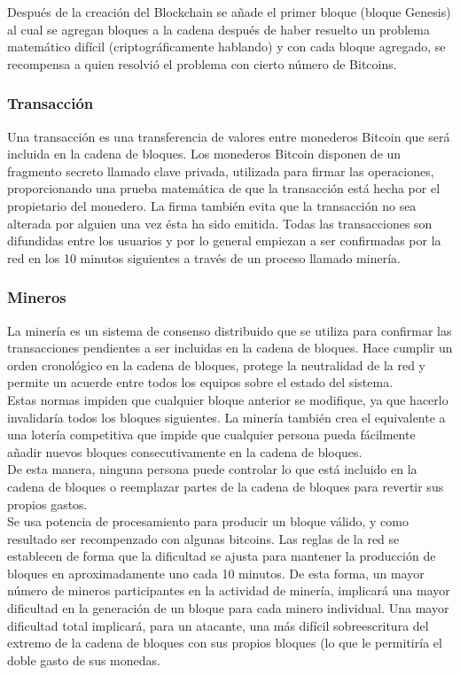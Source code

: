 \documentclass[12pt,letterpaper]{article}
\begin{document}
    Despu\'es de la creaci\'on del Blockchain se a\~nade el primer bloque (bloque Genesis) al cual se agregan bloques a la cadena despu\'es de haber resuelto un problema matem\'atico dif\'icil (criptogr\'aficamente hablando) y con cada bloque agregado, se recompensa a quien resolvi\'o el problema con cierto n\'umero de Bitcoins.

    \subsubsection*{Transacci\'on}

Una transacci\'on es una transferencia de valores entre monederos Bitcoin que ser\'a incluida en la cadena de bloques. Los monederos Bitcoin disponen de un fragmento secreto llamado clave privada, utilizada para firmar las operaciones, proporcionando una prueba matem\'atica de que la transacci\'on est\'a hecha por el propietario del monedero. La firma tambi\'en evita que la transacci\'on no sea alterada por alguien una vez \'esta ha sido emitida. Todas las transacciones son difundidas entre los usuarios y por lo general empiezan a ser confirmadas por la red en los 10 minutos siguientes a trav\'es de un proceso llamado miner\'ia.

		\subsubsection*{Mineros}
		La miner\'ia es un sistema de consenso distribuido que se utiliza para confirmar las transacciones pendientes a ser incluidas en la cadena de bloques. Hace cumplir un orden cronol\'ogico en la cadena de bloques, protege la neutralidad de la red y permite un acuerde entre todos los equipos sobre el estado del sistema. 
        \\
		Estas normas impiden que cualquier bloque anterior se modifique, ya que hacerlo invalidar\'ia todos los bloques siguientes. La miner\'ia tambi\'en crea el equivalente a una loter\'ia competitiva que impide que cualquier persona pueda f\'acilmente añadir nuevos bloques consecutivamente en la cadena de bloques. 
        \\
		De esta manera, ninguna persona puede controlar lo que est\'a incluido en la cadena de bloques o reemplazar partes de la cadena de bloques para revertir sus propios gastos.
        \\
		
Se usa potencia de procesamiento para producir un bloque v\'alido, y como resultado ser recompenzado con algunas bitcoins. Las reglas de la red se establecen de forma que la dificultad se ajusta para mantener la producci\'on de bloques en aproximadamente uno cada 10 minutos. De esta forma, un mayor n\'umero de mineros participantes en la actividad de miner\'ia, implicar\'a una mayor dificultad en la generaci\'on de un bloque para cada minero individual. Una mayor dificultad total implicar\'a, para un atacante, una m\'as dif\'icil sobreescritura del extremo de la cadena de bloques con sus propios bloques (lo que le permitir\'ia el doble gasto de sus monedas.
\\
\end{document}
